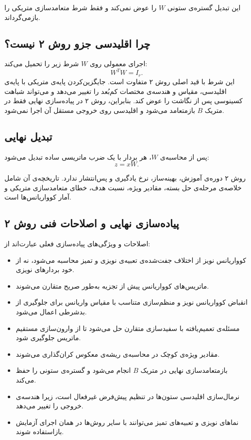 \documentclass[a4paper,12pt]{article}
\newcommand{\QR}{\lr{QR}}
\begin{document}
این تبدیل گستره‌ی ستونی $W$ را عوض نمی‌کند و فقط شرط متعامدسازی متریکی را بازمی‌گرداند.

\subsection{چرا \QR{} اقلیدسی جزو روش ۲ نیست؟}

اجرای \QR{} معمولی روی $W$ شرط زیر را تحمیل می‌کند:
\begin{equation}
 W^{T}W=I_r.
\end{equation}
این شرط با قید اصلی روش ۲ متفاوت است. جایگزین‌کردن پایه‌ی متریکی با پایه‌ی اقلیدسی، مقیاس و هندسه‌ی مختصات کم‌بُعد را تغییر می‌دهد و می‌تواند شباهت کسینوسی پس از نگاشت را عوض کند. بنابراین، روش ۲ در پیاده‌سازی نهایی فقط در متریک $B$ بازمتعامد می‌شود و \QR{} اقلیدسی روی خروجی مستقل آن اجرا نمی‌شود.

\subsection{تبدیل نهایی}

پس از محاسبه‌ی $W$، هر بردار با یک ضرب ماتریسی ساده تبدیل می‌شود:
\begin{equation}
 z=xW.
\end{equation}

روش ۲ دوره‌ی آموزش، بهینه‌ساز، نرخ یادگیری و پس‌انتشار ندارد. تاریخچه‌ی آن شامل خلاصه‌ی مرحله‌ی حل بسته، مقادیر ویژه، نسبت هدف، خطای متعامدسازی متریکی و آمار کوواریانس‌ها است.

\subsection{پیاده‌سازی نهایی و اصلاحات فنی روش ۲}

اصلاحات و ویژگی‌های پیاده‌سازی فعلی عبارت‌اند از:

\begin{itemize}
 \item کوواریانس نویز از اختلاف جفت‌شده‌ی تعبیه‌ی نویزی و تمیز محاسبه می‌شود، نه از خود بردارهای نویزی.
 \item ماتریس‌های کوواریانس پیش از تجزیه به‌طور صریح متقارن می‌شوند.
 \item انقباض کوواریانس نویز و منظم‌سازی متناسب با مقیاس واریانس برای جلوگیری از بدشرطی اعمال می‌شود.
 \item مسئله‌ی تعمیم‌یافته با سفیدسازی متقارن حل می‌شود تا از وارون‌سازی مستقیم ماتریس جلوگیری شود.
 \item مقادیر ویژه‌ی کوچک در محاسبه‌ی ریشه‌ی معکوس کران‌گذاری می‌شوند.
 \item بازمتعامدسازی نهایی در متریک $B$ انجام می‌شود و گستره‌ی ستونی را حفظ می‌کند.
 \item نرمال‌سازی اقلیدسی ستون‌ها در تنظیم پیش‌فرض غیرفعال است، زیرا هندسه‌ی خروجی را تغییر می‌دهد.
 \item نماهای نویزی و تعبیه‌های تمیز می‌توانند با سایر روش‌ها در همان اجرای آزمایش بازاستفاده شوند.
\end{itemize}
\end{document}
